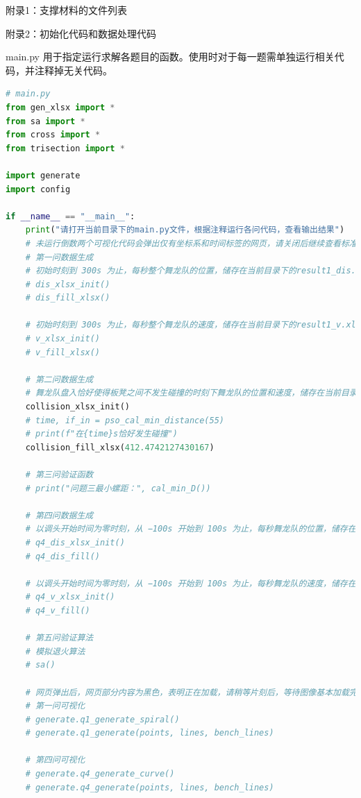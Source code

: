 \documentclass[a4paper]{article}
\begin{document}
	附录1：支撑材料的文件列表
	
	
	
	附录2：初始化代码和数据处理代码
	
	main.py 用于指定运行求解各题目的函数。使用时对于每一题需单独运行相关代码，并注释掉无关代码。
	\begin{lstlisting}[language=python,columns=fullflexible,frame=shadowbox]
# main.py
from gen_xlsx import *
from sa import *
from cross import *
from trisection import *

import generate
import config

if __name__ == "__main__":
	print("请打开当前目录下的main.py文件，根据注释运行各问代码，查看输出结果")
	# 未运行倒数两个可视化代码会弹出仅有坐标系和时间标签的网页，请关闭后继续查看标准输出框的结果
	# 第一问数据生成
	# 初始时刻到 300s 为止，每秒整个舞龙队的位置，储存在当前目录下的result1_dis.xlsx中
	# dis_xlsx_init()
	# dis_fill_xlsx()
	
	# 初始时刻到 300s 为止，每秒整个舞龙队的速度，储存在当前目录下的result1_v.xlsx中
	# v_xlsx_init()
	# v_fill_xlsx()
	
	# 第二问数据生成
	# 舞龙队盘入恰好使得板凳之间不发生碰撞的时刻下舞龙队的位置和速度，储存在当前目录下的result2.xlsx中
	collision_xlsx_init()
	# time, if_in = pso_cal_min_distance(55)
	# print(f"在{time}s恰好发生碰撞")
	collision_fill_xlsx(412.4742127430167)
	
	# 第三问验证函数
	# print("问题三最小螺距：", cal_min_D())
	
	# 第四问数据生成
	# 以调头开始时间为零时刻，从 −100s 开始到 100s 为止，每秒舞龙队的位置，储存在当前目录下的result4_dis.xlsx中
	# q4_dis_xlsx_init()
	# q4_dis_fill()
	
	# 以调头开始时间为零时刻，从 −100s 开始到 100s 为止，每秒舞龙队的速度，储存在当前目录下的result4_v.xlsx中
	# q4_v_xlsx_init()
	# q4_v_fill()
	
	# 第五问验证算法
	# 模拟退火算法
	# sa()
	
	# 网页弹出后，网页部分内容为黑色，表明正在加载，请稍等片刻后，等待图像基本加载完毕，使用鼠标拖动边框或在可视化界面中滑动滚轮调节图像大小
	# 第一问可视化
	# generate.q1_generate_spiral()
	# generate.q1_generate(points, lines, bench_lines)
	
	# 第四问可视化
	# generate.q4_generate_curve()
	# generate.q4_generate(points, lines, bench_lines)
 	\end{lstlisting}
 	
\end{document}
